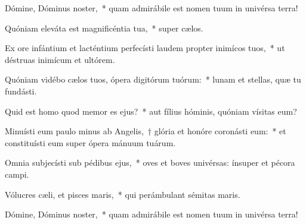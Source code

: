 \item Dómine, Dóminus noster,~* quam admirábile est nomen tuum in univérsa terra!

\item Quóniam eleváta est magnificéntia tua,~* super cælos.

\item Ex ore infántium et lacténtium perfecísti laudem propter inimícos tuos,~* ut déstruas inimícum et ultórem.

\item Quóniam vidébo cælos tuos, ópera digitórum tuórum:~* lunam et stellas, quæ tu fundásti.

\item Quid est homo quod memor es ejus?~* aut fílius hóminis, quóniam vísitas eum?

\item Minuísti eum paulo minus ab Angelis,~† glória et honóre coronásti eum:~* et constituísti eum super ópera mánuum tuárum.

\item Omnia subjecísti sub pédibus ejus,~* oves et boves univérsas: ínsuper et pécora campi.

\item Vólucres cæli, et pisces maris,~* qui perámbulant sémitas maris.

\item Dómine, Dóminus noster,~* quam admirábile est nomen tuum in univérsa terra!
